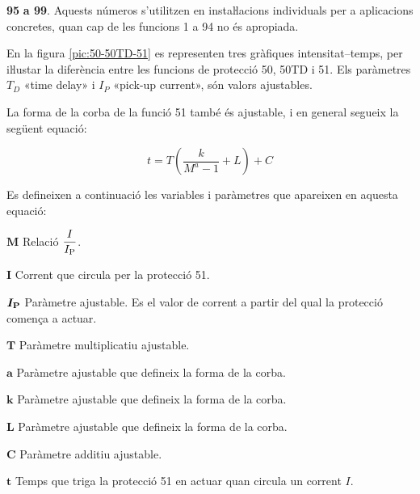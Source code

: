 \begin{multicols}{2}
\begin{list}{}
\item[\textbf{95}] \textbf{a 99}. Aquests números s'utilitzen en instaŀlacions
individuals per a aplicacions concretes, quan cap de les funcions 1
a 94 no és apropiada.

\end{list}
\end{multicols}

En la figura \vref{pic:50-50TD-51} es representen tres gràfiques intensitat--temps, per iŀlustar la diferència entre les funcions de protecció 50, 50TD i 51. Els paràmetres $T_D$ «time delay» i $I_P$ «pick-up current», són valors ajustables.
\begin{center}
    
    \label{pic:50-50TD-51}
\end{center}

La forma de la corba de la funció 51 també és ajustable, i en general segueix la següent equació:

\begin{equation}
  t = T \left( \frac{k}{M^a -1} + L \right) + C
\end{equation}

Es defineixen a continuació les variables i paràmetres que apareixen en aquesta equació:
\begin{list}{}
   {\setlength{\labelwidth}{10mm} \setlength{\leftmargin}{10mm} \setlength{\labelsep}{2mm}}
        \item[$\boldsymbol{M}$] Relació $\dfrac{I}{I_\mathrm{P}}$.
        \item[$\boldsymbol{I}$] Corrent que circula per la protecció 51.
        \item[$\boldsymbol{I_\mathrm{P}}$] Paràmetre ajustable. Es el valor de corrent a partir del qual la  protecció comença a actuar.
        \item[$\boldsymbol{T}$] Paràmetre multiplicatiu ajustable.
        \item[$\boldsymbol{a}$] Paràmetre ajustable que defineix la forma de la corba.
        \item[$\boldsymbol{k}$] Paràmetre ajustable que defineix la forma de la corba.
        \item[$\boldsymbol{L}$] Paràmetre ajustable que defineix la forma de la corba.
        \item[$\boldsymbol{C}$] Paràmetre additiu ajustable.
        \item[$\boldsymbol{t}$] Temps que triga la protecció 51 en actuar quan circula un corrent $I$.
\end{list}

